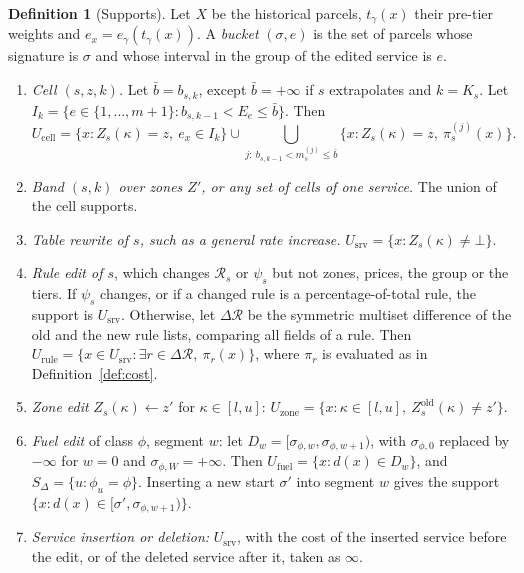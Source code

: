 \documentclass[11pt]{article}
\theoremstyle{definition}
\newtheorem{definition}[theorem]{Definition}
\theoremstyle{remark}
\begin{document}
\begin{definition}[Supports]\label{def:supports}
Let $X$ be the historical parcels, $t_\gamma(x)$ their pre-tier weights and
$e_x=e_\gamma(t_\gamma(x))$. A \emph{bucket} $(\sigma,e)$ is the set of parcels whose signature
is $\sigma$ and whose interval in the group of the edited service is $e$.
\begin{enumerate}[label=(S\arabic*),leftmargin=*]
\item \emph{Cell $(s,z,k)$.} Let $\bar b=b_{s,k}$, except $\bar b=+\infty$ if $s$
extrapolates and $k=K_s$. Let $I_k=\{e\in\{1,\dots,m+1\}:b_{s,k-1}<E_e\le\bar b\}$. Then
\[
U_{\mathrm{cell}}=\{x:Z_s(\kappa)=z,\ e_x\in I_k\}\cup\bigcup_{j:\ b_{s,k-1}<m^{(j)}_s\le\bar b}\{x:Z_s(\kappa)=z,\ \pi^{(j)}_s(x)\}.
\]
\item \emph{Band $(s,k)$ over zones $Z'$, or any set of cells of one service.} The union of
the cell supports.
\item \emph{Table rewrite of $s$, such as a general rate increase.}
$U_{\mathrm{srv}}=\{x:Z_s(\kappa)\ne\bot\}$.
\item \emph{Rule edit of $s$}, which changes $\mathcal R_s$ or $\psi_s$ but not zones, prices,
the group or the tiers. If $\psi_s$ changes, or if a changed rule is a
percentage-of-total rule, the support is $U_{\mathrm{srv}}$. Otherwise, let $\Delta\mathcal R$ be
the symmetric multiset difference of the old and the new rule lists, comparing all fields
of a rule. Then
$U_{\mathrm{rule}}=\{x\in U_{\mathrm{srv}}:\exists r\in\Delta\mathcal R,\ \pi_r(x)\}$, where $\pi_r$
is evaluated as in Definition~\ref{def:cost}.
\item \emph{Zone edit} $Z_s(\kappa)\leftarrow z'$ for $\kappa\in[l,u]$:
$U_{\mathrm{zone}}=\{x:\kappa\in[l,u],\ Z^{\mathrm{old}}_s(\kappa)\ne z'\}$.
\item \emph{Fuel edit} of class $\phi$, segment $w$: let $D_w=[\sigma_{\phi,w},\sigma_{\phi,w+1})$,
with $\sigma_{\phi,0}$ replaced by $-\infty$ for $w=0$ and $\sigma_{\phi,W}=+\infty$. Then
$U_{\mathrm{fuel}}=\{x:d(x)\in D_w\}$, and $S_\Delta=\{u:\phi_u=\phi\}$. Inserting a new start
$\sigma'$ into segment $w$ gives the support $\{x:d(x)\in[\sigma',\sigma_{\phi,w+1})\}$.
\item \emph{Service insertion or deletion:} $U_{\mathrm{srv}}$, with the cost of the inserted
service before the edit, or of the deleted service after it, taken as $\infty$.
\end{enumerate}
\end{definition}
\end{document}
